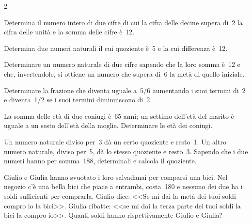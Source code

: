 \begin{htmulticols}{2}
\begin{esercizio}[*]
 \label{ese:22.84}
Determina il numero intero di due cifre di cui la cifra delle decine 
supera di~2 la cifra delle unità e la somma delle cifre è~12.
\end{esercizio}

\begin{esercizio}
 \label{ese:22.85}
Determina due numeri naturali il cui quoziente è~5 e la cui differenza 
è~12.
\end{esercizio}

\begin{esercizio}[*]
 \label{ese:22.86}
Determinare un numero naturale di due cifre sapendo che la loro somma
è~12 e che, invertendole, si ottiene un numero che supera di~6 la
metà di quello iniziale.
\sol{}
\end{esercizio}

\begin{esercizio}
 \label{ese:22.87}
Determinare la frazione che diventa uguale a~5/6 aumentando i suoi
termini di~2 e diventa~1/2 se i suoi termini diminuiscono di~2.
\end{esercizio}

\begin{esercizio}[*]
 \label{ese:22.88}
La somma delle età di due coniugi è~65 anni; un settimo
dell'età del marito è uguale a un sesto
dell'età della moglie. Determinare le età dei
coniugi.
\end{esercizio}

\begin{esercizio}[*]
 \label{ese:22.89}
Un numero naturale diviso per~3 dà un certo quoziente e resto~1. Un
altro numero naturale, diviso per~5, dà lo stesso quoziente e resto~3.
Sapendo che i due numeri hanno per somma~188, determinali e calcola
il quoziente.
\end{esercizio}

\begin{esercizio}[*]
 \label{ese:22.90}
Giulio e Giulia hanno svuotato i loro
salvadanai per comparsi una bici. Nel negozio c'è
una bella bici che piace a entrambi, costa{\officialeuro}~180 e nessuno 
dei due ha i soldi sufficienti per comprarla. Giulio dice:
<<Se mi dai la metà dei tuoi soldi compro io la bici>>. 
Giulia ribatte: 
<<se mi dai la terza parte dei tuoi soldi la bici la compro io>>. 
Quanti soldi hanno rispettivamente Giulio e Giulia?
\end{esercizio}


\end{htmulticols}
